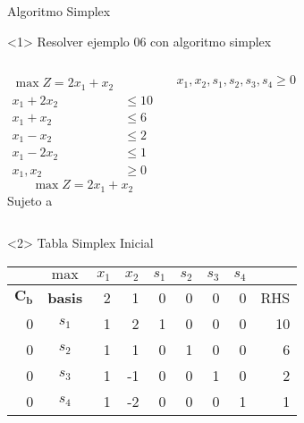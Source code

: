 \begin{frameExample}{Algoritmo Simplex}{}
  \begin{onlyenv}<1>
      Resolver ejemplo 06 con algoritmo simplex
  \begin{columns}
        \begin{align*}
      \max Z = 2x_1 + x_2 & \\[3mm]
    x_1 + 2x_2 & \leq 10\\
    x_1 + x_2 & \leq 6\\
    x_1 - x_2 & \leq 2\\
    x_1 - 2x_2 & \leq 1\\[5mm]
    x_1, x_2 & \geq 0
        \end{align*}
        \[ \max Z = 2x_1 + x_2 \]
      Sujeto a %

$x_1, x_2, s_1, s_2, s_3, s_4  \geq 0$
  \end{columns}
  \end{onlyenv}


\begin{onlyenv}<2>
  Tabla Simplex Inicial
  
  {\centering
\begin{tabular}{rc|rr|rrrr|r}
  &$\max$  & $x_1$ & $x_2$ & $s_1$ &$ s_2$ & $s_3$ & $s_4$ &  \\
  \toprule
  $\mathbf{C_b}$ & \textbf{basis} & 2 & 1 & 0 & 0 & 0 & 0 & RHS \\
  \midrule
0 & $s_1$ & 1 & 2 & 1 & 0 & 0 & 0 & 10 \\
0 & $s_2$ & 1 & 1 & 0 & 1 & 0 & 0 & 6 \\
0 & $s_3$ & 1 & -1 & 0 & 0 & 1 & 0 & 2 \\
  0 & $s_4$ & 1 & -2 & 0 & 0 & 0 & 1 & 1\\
  \bottomrule
\end{tabular}
  \par}
\end{onlyenv}


\end{frameExample}

